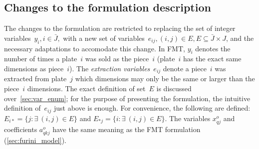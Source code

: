 \documentclass[ppgc,tese,english,formais,babel]{iiufrgs}
\begin{document}

\subsection{Changes to the formulation description}
\label{sec:enhanced}

The changes to the formulation are restricted to replacing the set of integer variables~\(y_i, i \in \bar{J},\) with a new set of variables~\(e_{ij}, (i, j) \in E, E \subseteq \bar{J} \times J\), and the necessary adaptations to accomodate this change.
In FMT, \(y_i\) denotes the number of times a plate~\(i\) was sold as the piece~\(i\) (plate~\(i\) has the exact same dimensions as piece~\(i\)).
The \emph{extraction variables}~\(e_{ij}\) denote a piece~\(i\) was extracted from plate~\(j\) which dimensions may only be the same or larger than the piece~\(i\) dimensions.
The exact definition of set~\(E\) is discussed over~\cref{sec:var_enum}; for the purpose of presenting the formulation, the intuitive definition of~\(e_{ij}\) just above is enough.
For convenience, the following are defined: \(E_{i*} = \{ j : \exists~(i, j) \in E \}\) and \(E_{*j} = \{i : \exists~(i, j) \in E \}\).
The variables \(x^o_{qj}\) and coefficients \(a^o_{qkj}\) have the same meaning as the FMT formulation (\cref{sec:furini_model}).
\end{document}
